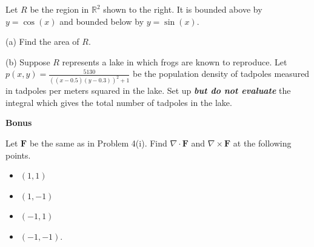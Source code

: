 \documentclass[12pt]{amsbook}
\newcommand{\DD}{\displaystyle}
\begin{document}
Let $R$ be the region in $\mathbb{R}^2$ shown to the right. It is bounded above by $y=\cos(x)$ and bounded below by $y=\sin(x)$.



(a) Find the area of $R$. 

\vspace{8cm}




(b) Suppose $R$ represents a lake in which frogs are known to reproduce. Let $\DD p(x,y) = \frac{5130}{((x-0.5)(y-0.3))^2+1}$ be the population density of tadpoles measured in tadpoles per meters squared in the lake. Set up \textit{\textbf{but do not evaluate}} the integral which gives the total number of tadpoles in the lake.














\newpage

\textbf{Bonus} 

Let $\textbf{F}$ be the same as in Problem 4(i). Find $\nabla\cdot \textbf{F}$ and $\nabla \times \textbf{F}$ at the following points.
\begin{itemize}
\item[(a)] $(1,1)$
\item[(b)] $(1,-1)$
\item[(c)] $(-1,1)$
\item[(d)] $(-1,-1)$.
\end{itemize}
\end{document}
